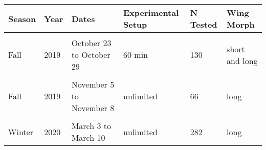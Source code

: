 \begin{table}
\centering
\begin{tabular}[t]{l|l|l|l|l|l}
\hline
Season & Year & Dates & Experimental Setup & N Tested & Wing Morph\\
\hline
\cellcolor[HTML]{f5f5f5}{Fall} & \cellcolor[HTML]{f5f5f5}{2019} & \cellcolor[HTML]{f5f5f5}{October 15 to October 23} & \cellcolor[HTML]{f5f5f5}{30 min} & \cellcolor[HTML]{f5f5f5}{182} & \cellcolor[HTML]{f5f5f5}{short and long}\\
\hline
Fall & 2019 & October 23 to October 29 & 60 min & 130 & short and long\\
\hline
\cellcolor[HTML]{f5f5f5}{Fall} & \cellcolor[HTML]{f5f5f5}{2019} & \cellcolor[HTML]{f5f5f5}{October 30 to November 4} & \cellcolor[HTML]{f5f5f5}{90 min} & \cellcolor[HTML]{f5f5f5}{126} & \cellcolor[HTML]{f5f5f5}{short and long}\\
\hline
Fall & 2019 & November 5 to November 8 & unlimited & 66 & long\\
\hline
\cellcolor[HTML]{f5f5f5}{Winter} & \cellcolor[HTML]{f5f5f5}{2020} & \cellcolor[HTML]{f5f5f5}{February 17 to February 28} & \cellcolor[HTML]{f5f5f5}{unlimited} & \cellcolor[HTML]{f5f5f5}{332} & \cellcolor[HTML]{f5f5f5}{long}\\
\hline
Winter & 2020 & March 3 to March 10 & unlimited & 282 & long\\
\hline
\end{tabular}
\end{table}
